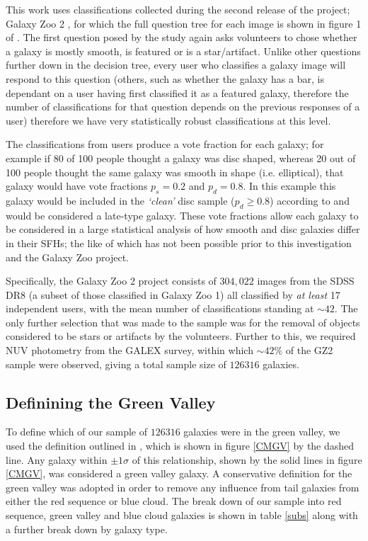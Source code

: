 \documentclass{mn2e}
\begin{document}
This work uses classifications collected during the second release of the project; Galaxy Zoo 2 \citep{GZ2}, for which the full question tree for each image is shown in figure 1 of \citet{GZ2}. The first question posed by the study again asks volunteers to chose whether a galaxy is mostly smooth, is featured or is a star/artifact. Unlike other questions further down in the decision tree, every user who classifies a galaxy image will respond to this question (others, such as whether the galaxy has a bar, is dependant on a user having first classified it as a featured galaxy, therefore the number of classifications for that question depends on the previous responses of a user) therefore we have very statistically robust classifications at this level. 

The classifications from users produce a vote fraction for each galaxy; for example if 80 of 100 people thought a galaxy was disc shaped, whereas 20 out of 100 people thought the same galaxy was smooth in shape (i.e. elliptical), that galaxy would have vote fractions $p_{s} = 0.2$ and $p_{d} = 0.8$. In this example this galaxy would be included in the \emph{`clean'} disc sample ($p_d \geq 0.8$) according to \cite{GZ2} and would be considered a late-type galaxy. These vote fractions allow each galaxy to be considered in a large statistical analysis of how smooth and disc galaxies differ in their SFHs; the like of which has not been possible prior to this investigation and the Galaxy Zoo project. 




Specifically, the Galaxy Zoo 2 project consists of $304, 022$ images from the SDSS DR8 (a subset of those classified in Galaxy Zoo 1) all classified by \emph{at least} 17 independent users, with the mean number of classifications standing at $\sim42$. The only further selection that was made to the sample was for the removal of  objects considered to be stars or artifacts by the volunteers. Further to this, we required NUV photometry from the GALEX survey, within which $\sim42\%$ of the GZ2 sample were observed, giving a total sample size of $126316$ galaxies. 



\subsection{Definining the Green Valley}\label{defGV}


To define which of our sample of $126316$ galaxies were in the green valley, we used the definition outlined in \citet{Baldry04}, which is shown in figure \ref{CMGV} by the dashed line. Any galaxy within $\pm 1\sigma$ of this relationship, shown by the solid lines in figure \ref{CMGV}, was considered a green valley galaxy. A conservative definition for the green valley was adopted in order to remove any influence from tail galaxies from either the red sequence or blue cloud. The break down of our sample into red sequence, green valley and blue cloud galaxies is shown in table \ref{subs} along with a further break down by galaxy type. 
\end{document}
